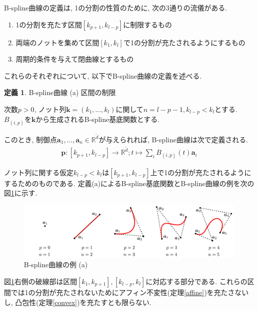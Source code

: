 \documentclass{jsarticle}
\newcommand\setR{\mathbb{R}}
\theoremstyle{definition}%
\newtheorem{defn}[thm]{定義}
\begin{document}
\newpage

B-spline曲線の定義は, 1の分割の性質のために, 次の3通りの流儀がある.
\begin{enumerate}
    \renewcommand{\labelenumi}{(\alph{enumi})}
    \item 1の分割を充たす区間$[k_{p+1},k_{l-p}]$に制限するもの
    \item 両端のノットを集めて区間$[k_1,k_l]$で1の分割が充たされるようにするもの
    \item 周期的条件を与えて閉曲線とするもの
\end{enumerate}
これらのそれぞれについて, 以下でB-spline曲線の定義を述べる.

\begin{screen}
	\begin{defn}
        \label{Def300a}
		B-spline曲線 (a) 区間の制限

        次数$p>0$, ノット列$\bm{k}=(k_1,\dots,k_l)$に関して$n=l-p-1, k_{l-p}<k_{l}$とする.
		$B_{(i,p)}$を$\bm{k}$から生成されるB-spline基底関数とする.

        このとき, 制御点$\bm{a}_1, \dots, \bm{a}_n\in \setR^{\tilde{d}}$が与えられれば, B-spline曲線は次で定義される.
		\begin{align}
			\bm{p}:[k_{p+1},k_{l-p}]\to \setR^{\tilde{d}};t\mapsto\sum_i B_{(i,p)}(t) \bm{a}_i
		\end{align}
	\end{defn}
\end{screen}
ノット列に関する仮定$k_{l-p}<k_{l}$は$[k_{p+1},k_{l-p}]$上で1の分割が充たされるようにするためのものである.
定義(a)によるB-spline基底関数とB-spline曲線の例を次の図\ref{Fig300a}に示す.
\addtocounter{footnote}{-1}
\begin{figure}[H]
	\centering
    \includegraphics[page=15,clip,width=160mm]{fig.pdf}
	\caption{B-spline曲線の例 (a)\protect\footnotemark}
	\label{Fig300a}
\end{figure}
図\ref{Fig300a}右側の破線部は区間$[k_{1},k_{p+1}], [k_{l-p},k_{l}]$に対応する部分である.
これらの区間では1の分割が充たされないためにアフィン不変性(定理\ref{affine})を充たさないし, 凸包性(定理\ref{convex})を充たすとも限らない.
\end{document}
